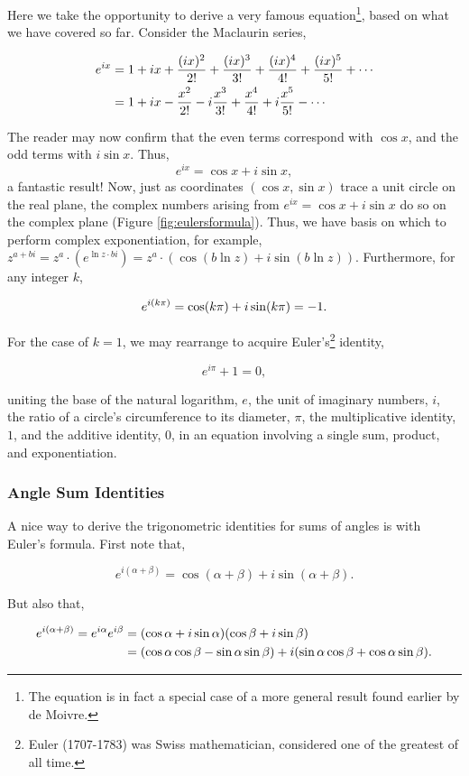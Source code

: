 \documentclass[11pt]{amsart}
\begin{document}
Here we take the opportunity to derive a very famous equation\footnote{The equation is in fact a special case of a more general result found earlier by de Moivre.}, based on what we have covered so far. Consider the Maclaurin series,

\begin{align}
e^{ix} &= 1 + ix + \frac{(ix)^2}{2!} + \frac{(ix)^3}{3!} + \frac{(ix)^4}{4!} + \frac{(ix)^5}{5!} + \cdots \notag \\
&= 1 + ix - \frac{x^2}{2!} - i\frac{x^3}{3!} + \frac{x^4}{4!} + i\frac{x^5}{5!} - \cdots \notag
\end{align}

The reader may now confirm that the even terms correspond with $\cos x$, and the odd terms with $i\sin x$. Thus, $$e^{ix} = \cos x + i\sin x,$$ a fantastic result! Now, just as coordinates $(\cos x, \sin x)$ trace a unit circle on the real plane, the complex numbers arising from $e^{ix} = \cos x + i\sin x$ do so on the complex plane (Figure \ref{fig:eulersformula}). Thus, we have basis on which to perform complex exponentiation, for example, $z^{a + bi} = z^a \cdot (e^{\ln z\cdot bi}) = z^a \cdot (\cos(b\ln z) + i\sin(b\ln z))$. Furthermore, for any integer $k$,

$$
e^{i(k\pi)} = \cos (k\pi) + i\sin (k\pi) \notag = -1.
$$

For the case of $k = 1$, we may rearrange to acquire Euler's\footnote{Euler (1707-1783) was Swiss mathematician, considered one of the greatest of all time.} identity,

$$
e^{i\pi} + 1 = 0,
$$

uniting the base of the natural logarithm, $e$, the unit of imaginary numbers, $i$, the ratio of a circle's circumference to its diameter, $\pi$, the multiplicative identity, $1$, and the additive identity, $0$, in an equation involving a single sum, product, and exponentiation.

\subsubsection{Angle Sum Identities}

A nice way to derive the trigonometric identities for sums of angles is with Euler's formula. First note that,

$$e^{i(\alpha + \beta)} = \cos (\alpha + \beta) + i\sin (\alpha + \beta).$$

But also that,

\begin{align}
e^{i(\alpha + \beta)} = e^{i\alpha}e^{i\beta} &= (\cos \alpha + i\sin \alpha)(\cos \beta + i\sin \beta) \notag \\
&= (\cos\alpha\cos\beta - \sin\alpha\sin\beta) + i(\sin\alpha\cos\beta + \cos\alpha\sin\beta).\notag
\end{align}
\end{document}
